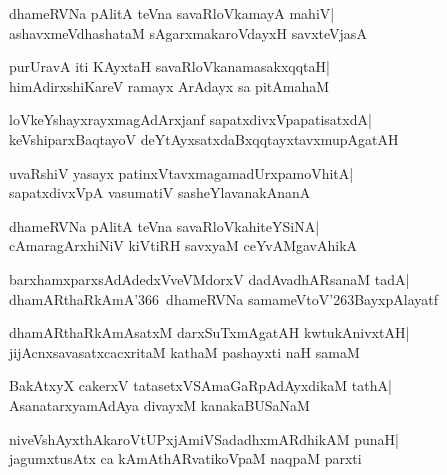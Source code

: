 \documentclass[twoside,12pt,openright]{book}
\def\S{\char'263}
\newcounter{shloka}[chapter]
\begin{document}
\begin{shloka}%
dhameRVNa pAlitA teVna savaRloVkamayA mahiV|\\
ashavxmeVdhashataM sAgarxmakaroVdayxH savxteVjasA
\end{shloka}

\begin{shloka}%
purUravA iti KAyxtaH savaRloVkanamasakxqqtaH|\\
himAdirxshiKareV ramayx ArAdayx sa pitAmahaM 
\end{shloka}

\begin{shloka}%
loVkeYshayxrayxmagAdArxjanf sapatxdivxVpapatisatxdA|\\
keVshiparxBaqtayoV deYtAyxsatxdaBxqqtayxtavxmupAgatAH
\end{shloka}

\begin{shloka}%
uvaRshiV yasayx patinxVtavxmagamadUrxpamoVhitA|\\
sapatxdivxVpA vasumatiV sasheYlavanakAnanA
\end{shloka}

\begin{shloka}%
dhameRVNa pAlitA teVna savaRloVkahiteYSiNA|\\
cAmaragArxhiNiV kiVtiRH savxyaM ceYvAMgavAhikA
\end{shloka}

\begin{shloka}%
barxhamxparxsAdAdedxVveVMdorxV dadAvadhARsanaM tadA|\\
dhamARthaRkAmA\char'366\ dhameRVNa samameVtoV\S BayxpAlayatf
\end{shloka}

\begin{shloka}%
dhamARthaRkAmAsatxM darxSuTxmAgatAH kwtukAnivxtAH|\\
jijAcnxsavasatxcacxritaM kathaM pashayxti naH samaM
\end{shloka}

\begin{shloka}%
BakAtxyX cakerxV tatasetxVSAmaGaRpAdAyxdikaM tathA|\\
AsanatarxyamAdAya divayxM kanakaBUSaNaM
\end{shloka}

\begin{shloka}%
niveVshAyxthAkaroVtUPxjAmiVSadadhxmARdhikAM punaH|\\
jagumxtusAtx ca kAmAthARvatikoVpaM naqpaM parxti
\end{shloka}
\end{document}
